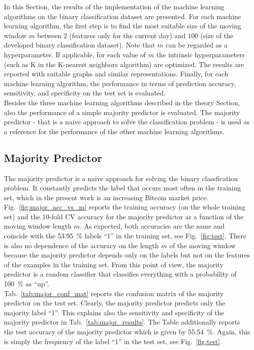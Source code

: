In this Section, the results of the implementation of the machine learning algorithms on the binary classification dataset are presented. For each machine learning algorithm, the first step is to find the most suitable size of the moving window $m$ between $2$ (features only for the current day) and $100$ (size of the developed binary classification dataset). Note that $m$ can be regarded as a hyperparameter. If applicable, for each value of $m$ the intrinsic hyperparameters (such as K in the K-nearest neighbors algorithm) are optimized. The results are reported with suitable graphs and similar representations. Finally, for each machine learning algorithm, the performance in terms of prediction accuracy, sensitivity, and specificity on the test set is evaluated. \\

Besides the three machine learning algorithms described in the theory Section, also the performance of a simple majority predictor is evaluated. The majority predictor - that is a naive approach to solve the classification problem - is used as a reference for the performance of the other machine learning algorithms.

\subsection{Majority Predictor}
The majority predictor is a naive approach for solving the binary classfication problem. It constantly predicts the label that occurs most often in the training set, which in the present work is an increasing Bitcoin market price. Fig.~\ref{fig:major_acc_vs_m} reports the training accuracy (on the whole training set) and the 10-fold CV accuracy for the majority predictor as a function of the moving window length $m$. As expected, both accuracies are the same and coincide with the \SI{53.95}{\percent} labels \enquote{1} in the training set, see Fig.~\ref{fig:test}. There is also no dependence of the accuracy on the length $m$ of the moving window because the majority predictor depends only on the labels but not on the features of the examples in the training set. From this point of view, the majority predictor is a random classifier that classifies everything with a probability of \SI{100}{\percent} as \enquote{up}. \\

Tab.~\ref{tab:major_conf_mat} reports the confusion matrix of the majority predictor on the test set. Clearly, the majority predictor predicts only the majority label \enquote{1}. This explains also the sensitivity and specificity of the majority predictor in Tab.~\ref{tab:major_results}. The Table additionally reports the test accuracy of the majority predictor which is given by \SI{55.54}{\percent}. Again, this is simply the frequency of the label \enquote{1} in the test set, see Fig.~\ref{fig:test}.

